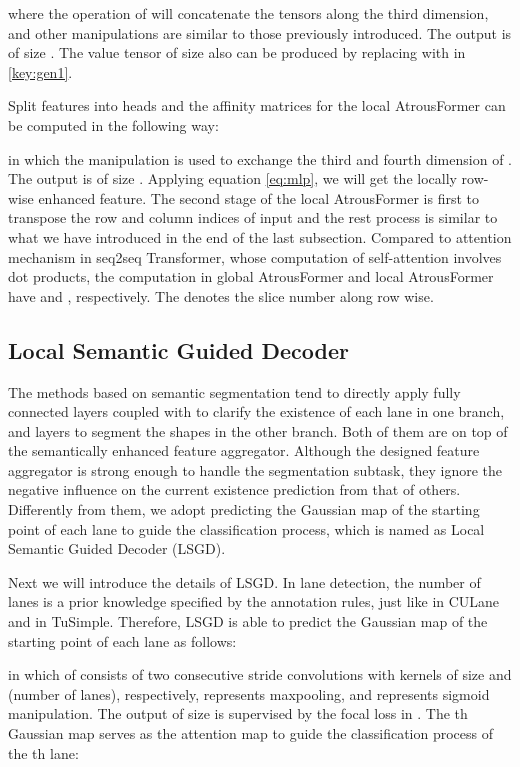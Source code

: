 \documentclass[preprint,12pt,review]{elsarticle}
\begin{document}
where the operation of  will concatenate the tensors along the third dimension, and other manipulations are similar to those previously introduced. The output  is of size . The value tensor  of size  also can be produced by replacing  with  in \eqref{key:gen1}. 

Split features into  heads and the 
affinity matrices for the local AtrousFormer can be computed in the following way:

in which the  manipulation is used to exchange the third and fourth dimension of . The output  is of size . Applying equation \eqref{eq:mlp}, we will get the locally row-wise enhanced feature. The second stage of the local AtrousFormer is first to transpose the row and column indices of input and the rest process is similar to what we have introduced in the end of the last subsection. Compared to attention mechanism in seq2seq Transformer, whose computation of self-attention involves  dot products, the computation in global AtrousFormer and local AtrousFormer have  and , respectively. The   denotes the slice number along row wise.

\subsection{Local Semantic Guided Decoder}
The methods based on semantic segmentation tend to directly apply fully connected layers coupled with  to clarify the existence of each lane in one branch, and  layers to segment the shapes in the other branch. Both of them are on top of the semantically enhanced feature aggregator. Although the designed feature aggregator is strong enough to handle the segmentation subtask, they ignore the negative influence on the current existence prediction from that of others. Differently from them, we adopt predicting the Gaussian map of the starting point of each lane to guide the classification process, which is named as Local Semantic Guided Decoder (LSGD).

Next we will introduce the details of LSGD. In lane detection, the number of lanes is a prior knowledge specified by the annotation rules, just like  in CULane and  in TuSimple. Therefore, LSGD is able to predict the Gaussian map of the starting point of each lane as follows:

in which  of consists of two consecutive  stride convolutions with kernels of size  and  (number of lanes), respectively,  represents  maxpooling, and  represents sigmoid manipulation. The output of size  is supervised by the focal loss in \cite{cornernet}. The th Gaussian map  serves as the attention map to 
guide the classification process of the th lane:
\end{document}
